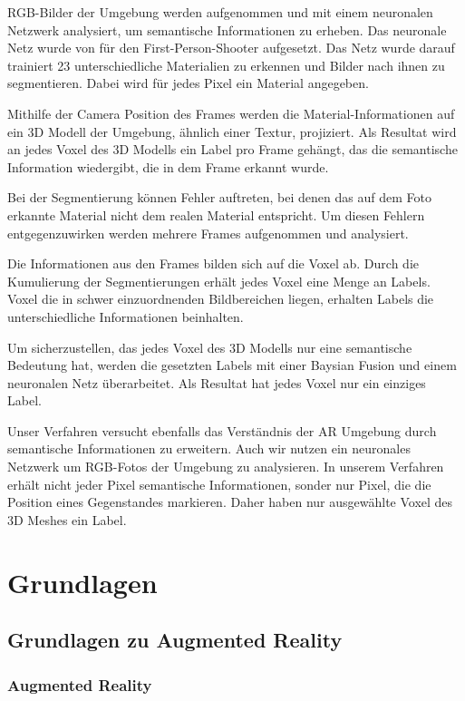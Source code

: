 RGB-Bilder der Umgebung werden aufgenommen und mit einem neuronalen Netzwerk analysiert, um semantische Informationen zu erheben. Das neuronale Netz wurde von \cite{contextawaremixedreality} für den First-Person-Shooter aufgesetzt. Das Netz wurde darauf trainiert 23 unterschiedliche Materialien zu erkennen und Bilder nach ihnen zu segmentieren. Dabei wird für jedes Pixel ein Material angegeben.

Mithilfe der Camera Position des Frames werden die Material-Informationen auf ein 3D Modell der Umgebung, ähnlich einer Textur, projiziert. Als Resultat wird an jedes Voxel des 3D Modells ein Label pro Frame gehängt, das die semantische Information wiedergibt, die in dem Frame erkannt wurde.

Bei der Segmentierung können Fehler auftreten, bei denen das auf dem Foto erkannte Material nicht dem realen Material entspricht. Um diesen Fehlern entgegenzuwirken werden mehrere Frames aufgenommen und analysiert. %

Die Informationen aus den Frames bilden sich auf die Voxel ab. Durch die Kumulierung der Segmentierungen erhält jedes Voxel eine Menge an Labels. Voxel die in schwer einzuordnenden Bildbereichen liegen, erhalten Labels die unterschiedliche Informationen beinhalten.

Um sicherzustellen, das jedes Voxel des 3D Modells nur eine semantische Bedeutung hat, werden die gesetzten Labels mit einer Baysian Fusion und einem neuronalen Netz überarbeitet. Als Resultat hat jedes Voxel nur ein einziges Label.

Unser Verfahren versucht ebenfalls das Verständnis der AR Umgebung durch semantische Informationen zu erweitern. Auch wir nutzen ein neuronales Netzwerk um RGB-Fotos der Umgebung zu analysieren.
In unserem Verfahren erhält nicht jeder Pixel semantische Informationen, sonder nur Pixel, die die Position eines Gegenstandes markieren. Daher haben nur ausgewählte Voxel des 3D Meshes ein Label.\citep{contextawaremixedreality}

\newpage
\section{Grundlagen}
\subsection{Grundlagen zu Augmented Reality}
\subsubsection{Augmented Reality} %

